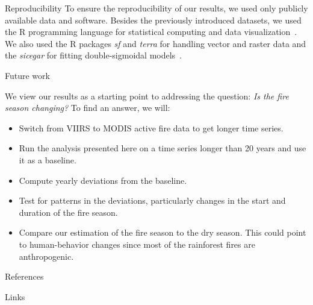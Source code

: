 \documentclass[20pt]{beamer}
\newcommand{\R}{R}
\begin{document}
\begin{frame}[fragile,t]
\begin{columns}[t]
\begin{column}{0.33\linewidth}
    \begin{block}{Reproducibility\vphantom{g}}
        \vspace{0.5cm}
        To ensure the reproducibility of our results, we used only publicly available data and software.
        Besides the previously introduced datasets, we used the \R{} programming language for statistical computing and data visualization~\cite{ihaka1996}.
        We also used the \R{} packages \textit{sf} and \textit{terra} for handling vector and raster data and the \textit{sicegar} for fitting double-sigmoidal models~\cite{pebesma2018,hijmans2020,caglar2018}.
    \end{block}

    \begin{block}{Future work\vphantom{g}}

        \vspace{0.5cm}

We view our results as a starting point to addressing the question: \textit{Is the fire season changing?}
To find an answer, we will:
\begin{itemize}
    \item Switch from VIIRS to MODIS active fire data to get longer time series.
    \item Run the analysis presented here on a time series longer than 20 years and use it as a baseline.
    \item Compute yearly deviations from the baseline.
    \item Test for patterns in the deviations, particularly changes in the start and duration of the fire season.
    \item Compare our estimation of the fire season to the dry season. This could point to human-behavior changes since most of the rainforest fires are anthropogenic.
\end{itemize}
    \end{block}

\vspace{0.5cm}

    \begin{block}{References\vphantom{g}}

\vspace{0.5cm}    



    \end{block}

\vspace{0.5cm}

    \begin{block}{Links}


\end{block}
\end{column}
\end{columns}
\end{frame}
\end{document}
